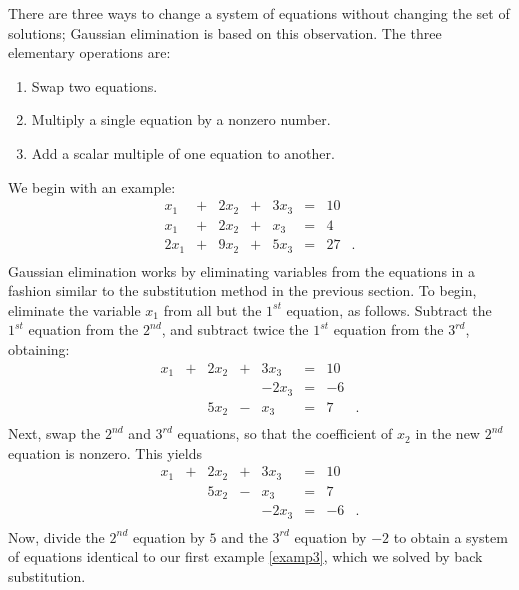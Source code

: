 \documentclass{ximera}
\begin{document}
There are three ways to change a system of equations without
changing the set of solutions; Gaussian elimination
 is based on this observation.  The
three elementary operations are:
\begin{enumerate}
\item   Swap two equations.
\item   Multiply a single equation by a nonzero number.
\item   Add a scalar multiple of one equation to another.
\end{enumerate}

We begin with an example:
\begin{equation}
\begin{array}{rcrcrcrl}
  x_1 & + & 2x_2 & + & 3x_3 & = &  10  & \\
  x_1 & + & 2x_2 & + &  x_3 & = &   4  & \\
 2x_1 & + & 9x_2 & + & 5x_3 & = &  27  & .\\
\end{array}
\end{equation}
Gaussian elimination works by eliminating variables from the
equations in a fashion similar to the substitution method in the
previous section.  To begin, eliminate the variable $x_1$ from
all but the $1^{st}$ equation, as follows.  Subtract the
$1^{st}$ equation from the $2^{nd}$, and subtract twice the
$1^{st}$ equation from the $3^{rd}$, obtaining:
\begin{equation}
\begin{array}{rcrcrcrl}
  x_1 & + & 2x_2 & + & 3x_3 & = &  10  & \\
      &   &      &   &-2x_3 & = &  -6  & \\
      &   & 5x_2 & - &  x_3 & = &   7  & .\\
\end{array}
\end{equation}
Next, swap the $2^{nd}$ and $3^{rd}$ equations, so that
the coefficient of $x_2$ in the new $2^{nd}$ equation is nonzero.
This yields
\begin{equation}
\begin{array}{rcrcrcrl}
  x_1 & + & 2x_2 & + & 3x_3 & = &  10  & \\
      &   & 5x_2 & - &  x_3 & = &   7  & \\
      &   &      &   &-2x_3 & = &  -6  & .\\
\end{array}
\end{equation}
Now, divide the $2^{nd}$ equation by $5$ and the $3^{rd}$
equation by $-2$ to obtain a system of equations identical to
our first example \eqref{examp3}, which we solved by back
substitution.
\end{document}
